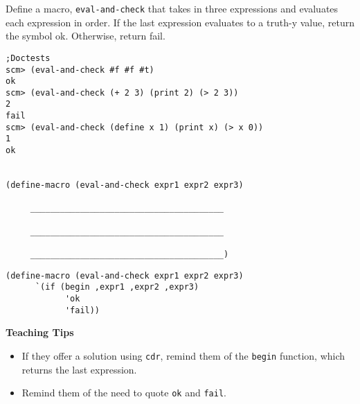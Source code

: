 \begin{blocksection}

\question Define a macro, \texttt{eval-and-check} that takes in three expressions and evaluates each expression in order. 
If the last expression evaluates to a truth-y value, return the symbol ok. Otherwise, return fail.

\begin{lstlisting}
;Doctests
scm> (eval-and-check #f #f #t)
ok
scm> (eval-and-check (+ 2 3) (print 2) (> 2 3))
2
fail
scm> (eval-and-check (define x 1) (print x) (> x 0))
1
ok


(define-macro (eval-and-check expr1 expr2 expr3)
     
     _______________________________________

     _______________________________________

     _______________________________________)
\end{lstlisting}
\end{blocksection}
\begin{blocksection}
\begin{solution}[.25in]
\begin{lstlisting}
(define-macro (eval-and-check expr1 expr2 expr3)
      `(if (begin ,expr1 ,expr2 ,expr3)
            'ok
            'fail))
\end{lstlisting}
\end{solution}

\end{blocksection}

\begin{blocksection}
\begin{guide}
\textbf{Teaching Tips}
\begin{itemize}
	\item If they offer a solution using \lstinline{cdr}, remind them of the \lstinline{begin} function, which returns the last expression.
	\item Remind them of the need to quote \lstinline{ok} and \lstinline{fail}.
\end{itemize}
\end{guide}
\end{blocksection}





